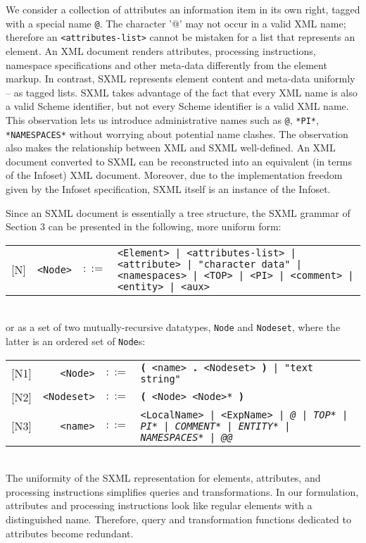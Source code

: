 \documentclass[10pt]{article}
\begin{document}
We consider a collection of attributes an information item in its
own right, tagged with a special name \texttt{@}. The character '@'
may not occur in a valid XML name; therefore
an \texttt{<attributes-list>} cannot be mistaken for a list that represents an element. An XML
document renders attributes, processing instructions, namespace
specifications and other meta-data differently from the element
markup. In contrast, SXML represents element content and meta-data
uniformly -- as tagged lists.  SXML takes advantage of the fact that
every XML name is also a valid Scheme identifier, but not every Scheme
identifier is a valid XML name. This observation lets us introduce
administrative names such as \texttt{@}, \texttt{*PI*}, \texttt{*NAMESPACES*} without worrying about potential name
clashes. The observation also makes the relationship between XML and SXML
well-defined. An XML document converted to SXML can be reconstructed
into an equivalent (in terms of the Infoset) XML document. Moreover, due
to the implementation freedom given by the Infoset specification, SXML
itself is an instance of the Infoset.

Since an SXML document is essentially a tree structure, the SXML grammar of Section 3 can be presented in the following, more uniform form:

\begin{tabular}{rrcp{2.8in}}
{[}N{]} & \texttt{<Node>} &  $::=$ & \texttt{<Element> | <attributes-list> | <attribute> | "character data" | <namespaces> | <TOP> | <PI> | <comment> | <entity> | <aux> } \\
\end{tabular}
\\
or as a set of two mutually-recursive datatypes, 
\texttt{Node} and \texttt{Nodeset}, where the latter is an ordered set of \texttt{Node}s: 

\begin{tabular}{rrcp{2.8in}}
{[}N1{]} & \texttt{<Node>} &  $::=$ & \texttt{\textbf{(} <name>\textbf{ . }<Nodeset> \textbf{)} | "text string" } \\
{[}N2{]} & \texttt{<Nodeset>} &  $::=$ & \texttt{\textbf{(} <Node> <Node>* \textbf{)} } \\
{[}N3{]} & \texttt{<name>} &  $::=$ & \texttt{<LocalName> | <ExpName> | {\itshape @} | {\itshape *TOP*} | {\itshape *PI*} | {\itshape *COMMENT*} | {\itshape *ENTITY*} | {\itshape *NAMESPACES*} | {\itshape @@} } \\
\end{tabular}
\\
The uniformity of the SXML representation for elements,
attributes, and processing instructions simplifies queries and
transformations. In our formulation, attributes and processing
instructions look like regular elements with a distinguished
name. Therefore, query and transformation functions dedicated to
attributes become redundant.
\end{document}
